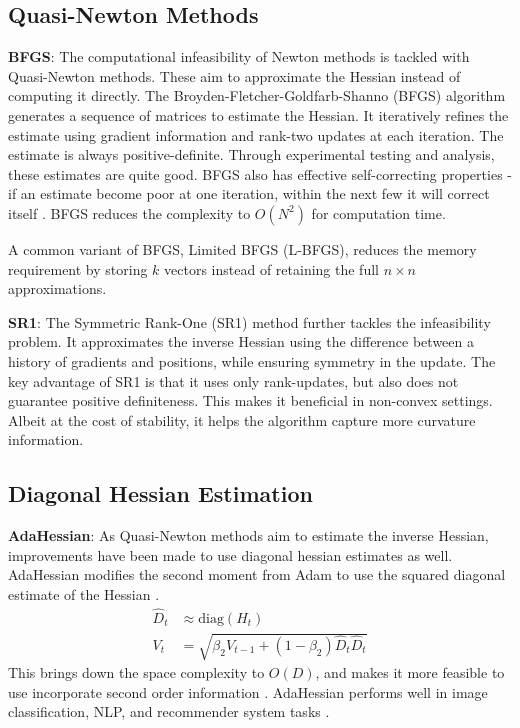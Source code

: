 \subsection{Quasi-Newton Methods}
\textbf{BFGS}: The computational infeasibility of Newton methods is tackled with Quasi-Newton methods. These aim to approximate the Hessian instead of computing it directly. The Broyden-Fletcher-Goldfarb-Shanno (BFGS) algorithm generates a sequence of matrices to estimate the Hessian. It iteratively refines the estimate using gradient information and rank-two updates at each iteration. The estimate is always positive-definite. Through experimental testing and analysis, these estimates are quite good. BFGS also has effective self-correcting properties - if an estimate become poor at one iteration, within the next few it will correct itself \citep{NoceWrig06}. BFGS reduces the complexity to $O(N^2)$ for computation time.  

A common variant of BFGS, Limited BFGS (L-BFGS), reduces the memory requirement by storing $k$ vectors instead of retaining the full $n\times n$ approximations.

\textbf{SR1}: The Symmetric Rank-One (SR1) method further tackles the infeasibility problem. It approximates the inverse Hessian using the difference between a history of gradients and positions, while ensuring symmetry in the update. The key advantage of SR1 is that it uses only rank-updates, but also does not guarantee positive definiteness. This makes it beneficial in non-convex settings. Albeit at the cost of stability, it helps the algorithm capture more curvature information.

\subsection{Diagonal Hessian Estimation}
\textbf{AdaHessian}: As Quasi-Newton methods aim to estimate the inverse Hessian, improvements have been made to use diagonal hessian estimates as well. AdaHessian modifies the second moment from Adam to use the squared diagonal estimate of the Hessian \citep{yao2021adahessianadaptivesecondorder}.
\begin{align}
    \hat{D}_t &\approx \text{diag}(H_t) \\
    V_t &= \sqrt{\beta_2 V_{t-1} + (1 - \beta_2) \hat{D}_t\hat{D}_t}
\end{align}
This brings down the space complexity to $O(D)$, and makes it more feasible to use incorporate second order information \citep{yao2021adahessianadaptivesecondorder}. AdaHessian performs well in image classification, NLP, and recommender system tasks \citep{yao2021adahessianadaptivesecondorder}.


